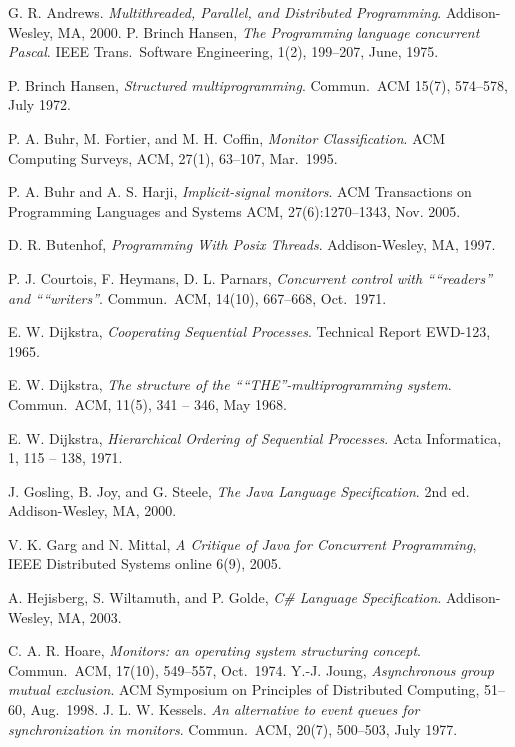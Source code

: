 \documentclass[preprint]{sigplanconf}
\begin{document}
\begin{thebibliography}{}
\softraggedright

    G. R. Andrews. \emph{Multithreaded, Parallel, and Distributed Programming}.
    Addison-Wesley, MA, 2000.  
  P. Brinch Hansen, \emph{The Programming language concurrent Pascal}. IEEE
  Trans.~Software Engineering, 1(2), 199--207, June, 1975.

    P. Brinch Hansen, \emph{Structured multiprogramming}. Commun.~ACM 15(7),
    574--578, July 1972.

  P. A. Buhr, M. Fortier, and M. H. Coffin, \emph{Monitor Classification}. ACM 
  Computing Surveys, ACM, 27(1), 63--107, 
  Mar.~1995.
  
  P. A. Buhr and A. S. Harji, \emph{Implicit-signal monitors}. ACM 
  Transactions on Programming Languages and Systems ACM, 27(6):1270--1343, 
  Nov. 2005.

  D. R. Butenhof, \emph{Programming With Posix Threads}.
  Addison-Wesley, MA, 1997.

    P. J. Courtois, F. Heymans, D. L. Parnars, \emph{Concurrent control with
    “``readers'' and “``writers''}. Commun.~ACM, 14(10), 667--668, Oct.~1971.

    E. W. Dijkstra, \emph{Cooperating Sequential Processes}.  Technical Report
    EWD-123, 1965. 
    
    E. W. Dijkstra, \emph{The structure of the “``THE''-multiprogramming
    system}. Commun.~ACM, 11(5), 341 -- 346, May 1968. 

    E. W. Dijkstra, \emph{Hierarchical Ordering of Sequential Processes}. Acta
    Informatica, 1, 115 -- 138, 1971.

    J. Gosling, B. Joy, and G. Steele, \emph{The Java Language Specification}.
    2nd ed. Addison-Wesley, MA, 2000. 

    V. K. Garg and N. Mittal, \emph{A Critique of Java for Concurrent
    Programming}, IEEE Distributed Systems online 6(9), 2005.

    A. Hejisberg, S. Wiltamuth, and P. Golde, \emph{C\# Language
    Specification}. Addison-Wesley, MA, 2003.

  C. A. R. Hoare, \emph{Monitors: an operating system structuring concept}. 
  Commun.~ACM, 17(10), 549--557, Oct.~1974. 
 Y.-J. Joung, \emph{Asynchronous group mutual exclusion}. ACM Symposium on 
    Principles of Distributed Computing, 51--60, Aug.~1998. 
    J. L. W. Kessels. \emph{An alternative to event queues for synchronization 
    in monitors}. Commun.~ACM, 20(7), 500--503, July 1977.
  

\end{thebibliography}
\end{document}
